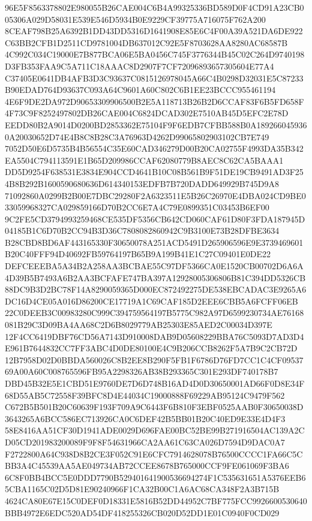 \documentclass[UTF8,fontset=fandol,zihao=-4,a4paper]{ctexart}
\begin{document}
{{96E5F8563378802E980055B26CAE004C6B4A99325336BD589D0F4CD91A23CB005306A029D58031E539E546D5934B0E9229CF39775A716075F762A200
8CEAF798B25A6392B1DD43DD5316D1641908E85E6C4F00A39A521DA6DE922C63BB2CFB1D2511CD9781004DB637012C92E5F8703628AA8280AC68587B
4C992C034C19000E7B877BCA06E5BA0456C745F3776344B45C02C264D9740198D3FB353FAA9C5A711C18AAAC8D2907F7CF72096893657305604E77A4
C37405E0641DB4AFB3D3C93637C0815126978045A66C4B0298D32031E5C87233B90EDAD764D93637C093A64C9601A60C802C6B1EE23BCCC955461194
4E6F9DE2DA972D90653309906500B2E5A118713B26B2D6CCAF83F6B5FD658F4F73C9F8252497802DB26CAE004C6824DCAD302E7510AB45D5EFC2E78D
EEDD80B2A9014D0200BD2853362E75104F9F6EDB7CFBB588B0A1892660459360A20030652D74E4B8C8B28C3A76963D4262D99065802903102CB7E749
7052D50E6D5735B4B56554C35E60CAD346279D00B20CA02755F4993DA35B342EA5504C794113591E1B65D209986CCAF62080779B8AEC8C62CA5BAAA1
DD5D9254F638531E3834E904CCD4641B10C08B561B9F51DE19CB9491AD3F254B8B292B1600590680636D614340153EDFB7B720DADD649929B745D9A8
71092860A0299B2B00E7DBC29280F2A6323511E5B26C26970E4DBA024CD9BE033059968327CA029859166D70B2CC6E7A4C79E0899351C03453B6EF00
9C2FE5CD3794993259468CE535DF5356CB642CD060CAF61D80F3FDA187945D04185B1C6D70B2CC94B3D36C7808082860942C9B3100E73B28DFBE3634
B28CBD8BD6AF443165330F30650078A251ACD5491D265906596E9E3739469601B20C40FFF94D40692FB59764197B65B9A199B41E1C27C09401E0DE22
DEFCEEEBA5A34B2A258AA3BCBAE55C97DF5366CA0E1520CB00702D6A6A4D39B5B7493A6B2AA3BCFAFE747BA397A12928005306806B81C394DD5326CB
88DC9B3D2BC78F14A8290059365D000EC872492275DE538EBCADAC3E9265A6DC16D4CE05A016D86200CE17719A1C69CAF185D2EEE6CBB5A6FCFF06EB
22C0DEEB3C00983280C999C394759564197B5775C982A97D6599230734AE76168081B29C3D09BA4AA68C2D6B8029779AB25303E85AED2C00034D397E
12F4CC6419DBF76CD56A7143D910008DAB9D05608229BBA76C5093D7AD3D4E961B7644832CC7FF3ABC4D0DE80100E4C9B206CCB8262F5A7B9C2CB72D
12B7958D02D0BBDA560026C8B2EE8B290F5FB1F6786D76FD7CC1C4CF0953769A00A60C008765596FB95A2298326AB38B293365C301E293DF740178B7
DBD45B32E5E1CBD51E9760DE7D6D748B16AD4D0D30650001AD66F0D8E34F68D55AB5C72558F39BFC8D4E44034C19000888F69229AB95124C9479F562
C672B5B501B20C60639F193F709A9C6443F6B810F3EBF0525AAB0F30650038D3643265A6BCC586EC713926CA0C6DEF42B5BB01B20C40ED9E33E4D4F3
58E8416AA51CF30D1941ADE0029D696FAE00BC52BE99B271916504AC139A2CD05CD201983200089F9F8F54631966CA2AA61C63CA026D7594D9DAC0A7
F2722800A64C938D8B2CE3F052C91E6CFC7914628078B76500CCCC1FA66C5CBB3A4C45539AA5AE049734AB72CCEE8678B765000CCF9FE061069F3BA6
6C8F0BB4BCC5E0DDD7790B529401641900536694274F1C535631651A5376EEB65CBA1165C02D5D81E90240966F1CA32B00C1A6AC68CA348F2A3B715B
4624CA80E67E15C0DEF0D18331E5816B52DD44952C7BF775FCC9926600530640BBB4972E6EDC520AD54DF418255326CB020D52DD1E01C0940F0CD029
}}
\end{document}
